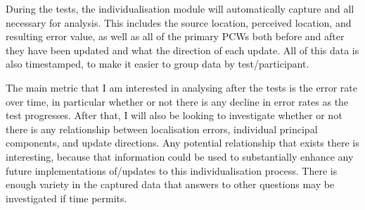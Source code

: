 During the tests, the individualisation module will automatically capture and all necessary for analysis. This includes the source location, perceived location, and resulting error value, as well as all of the primary PCWs both before and after they have been updated and what the direction of each update. All of this data is also timestamped, to make it easier to group data by test/participant. 

The main metric that I am interested in analysing after the tests is the error rate over time, in particular whether or not there is any decline in error rates as the test progresses. After that, I will also be looking to investigate whether or not there is any relationship between localisation errors, individual principal components, and update directions. Any potential relationship that exists there is interesting, because that information could be used to substantially enhance any future implementations of/updates to this individualisation process. There is enough variety in the captured data that answers to other questions may be investigated if time permits. 